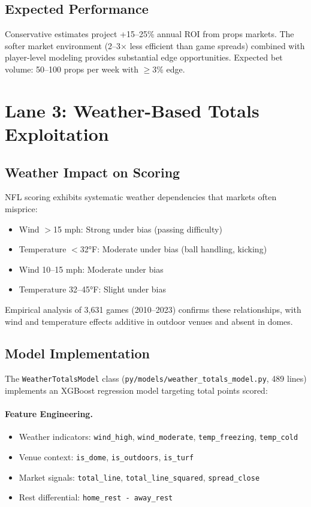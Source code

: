 \subsection{Expected Performance}

Conservative estimates project +15--25\% annual ROI from props markets. The softer market environment (2--3× less efficient than game spreads) combined with player-level modeling provides substantial edge opportunities. Expected bet volume: 50--100 props per week with $\geq$3\% edge.

\section{Lane 3: Weather-Based Totals Exploitation}

\subsection{Weather Impact on Scoring}

NFL scoring exhibits systematic weather dependencies that markets often misprice:
\begin{itemize}
  \item Wind $>$15 mph: Strong under bias (passing difficulty)
  \item Temperature $<$32°F: Moderate under bias (ball handling, kicking)
  \item Wind 10--15 mph: Moderate under bias
  \item Temperature 32--45°F: Slight under bias
\end{itemize}

Empirical analysis of 3,631 games (2010--2023) confirms these relationships, with wind and temperature effects additive in outdoor venues and absent in domes.

\subsection{Model Implementation}

The \texttt{WeatherTotalsModel} class (\texttt{py/models/weather\_totals\_model.py}, 489 lines) implements an XGBoost regression model targeting total points scored:

\paragraph{Feature Engineering.}
\begin{itemize}
  \item Weather indicators: \texttt{wind\_high}, \texttt{wind\_moderate}, \texttt{temp\_freezing}, \texttt{temp\_cold}
  \item Venue context: \texttt{is\_dome}, \texttt{is\_outdoors}, \texttt{is\_turf}
  \item Market signals: \texttt{total\_line}, \texttt{total\_line\_squared}, \texttt{spread\_close}
  \item Rest differential: \texttt{home\_rest - away\_rest}
\end{itemize}

